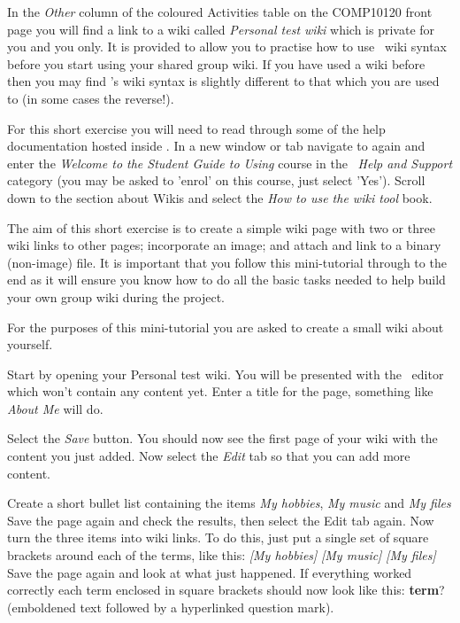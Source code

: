 In the \emph{Other} column of the coloured Activities table on the COMP10120 front page you will find a link to a wiki called \emph{Personal test wiki} which is private for you and you only. It is provided to allow you to practise how to use \moodle\ wiki syntax before you start using your shared group wiki. If you have used a wiki before then you may find \Moodle's wiki syntax is slightly different to that which you are used to (in some cases the reverse!).

For this short exercise you will need to read through some of the help documentation hosted inside \moodle. In a new window or tab navigate to  again and enter the \emph{Welcome to the Student Guide to Using \Moodle} course in the \moodle\ \emph{Help and Support}  category (you may be asked to 'enrol' on this course, just select 'Yes'). Scroll down to the section about Wikis and select the \emph{How to use the wiki tool} book.

The aim of this short exercise is to create a simple wiki page with two or three wiki links to other pages; incorporate an image; and attach and link to a binary (non-image) file. It is important that you follow this mini-tutorial through to the end as it will ensure you know how to do all the basic tasks needed to help build your own group wiki during the project.

For the purposes of this mini-tutorial you are asked to create a small wiki about yourself.

Start by opening your Personal test wiki. You will be presented with the \moodle\ editor which won't contain any content yet. Enter a title for the page, something like \emph{About Me} will do.

Select the \emph{Save} button. You should now see the first page of your wiki with the content you just added. Now select the \emph{Edit} tab so that you can add more content.

Create a short bullet list containing the items \emph{My hobbies},  \emph{My music}  and \emph{My files}  Save the page again and check the results, then select the Edit tab again. Now turn the three items into wiki links. To do this, just put a single set of square brackets around each of the terms, like this: \emph{[My hobbies]}  \emph{[My music]}  \emph{[My files]}  Save the page again and look at what just happened. If everything worked correctly each term enclosed in square brackets should now look like this: \textbf{term}? (emboldened text followed by a hyperlinked question mark).

